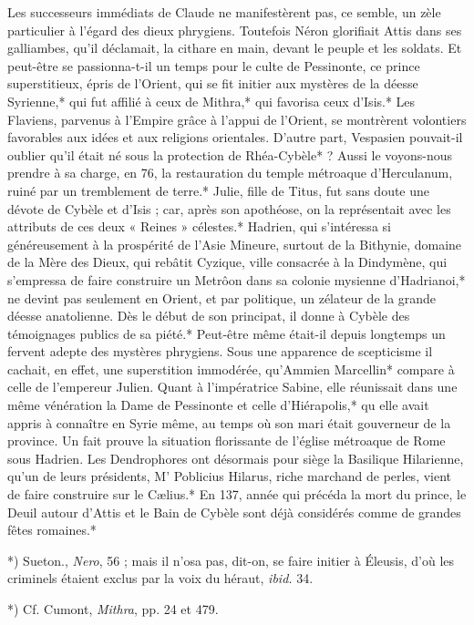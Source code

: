 \documentclass[a4paper, 11pt, oneside, polutonikogreek, french]{article}
\begin{document}
Les successeurs immédiats de Claude ne manifestèrent pas, ce semble, un zèle particulier à l'égard des dieux phrygiens. Toutefois Néron glorifiait Attis dans ses galliambes, qu'il déclamait, la cithare en main, devant le peuple et les soldats. Et peut-être se passionna-t-il un temps pour le culte de Pessinonte, ce prince superstitieux, épris de l'Orient, qui se fit initier aux mystères de la déesse Syrienne,* qui fut affilié à ceux de Mithra,* qui favorisa ceux d'Isis.* Les Flaviens, parvenus à l'Empire grâce à l'appui de l'Orient, se montrèrent volontiers favorables aux idées et aux religions orientales. D'autre part, Vespasien pouvait-il oublier qu'il était né sous la protection de Rhéa-Cybèle* ? Aussi le voyons-nous prendre à sa charge, en 76, la restauration du temple métroaque d'Herculanum, ruiné par un tremblement de terre.* Julie, fille de Titus, fut sans doute une dévote de Cybèle et d'Isis ; car, après son apothéose, on la représentait avec les attributs de ces deux « Reines » célestes.* Hadrien, qui s'intéressa si généreusement à la prospérité de l'Asie Mineure, surtout de la Bithynie, domaine de la Mère des Dieux, qui rebâtit Cyzique, ville consacrée à la Dindymène, qui s'empressa de faire construire un Metrôon dans sa colonie mysienne d'Hadrianoi,* ne devint pas seulement en Orient, et par politique, un zélateur de la grande déesse anatolienne. Dès le début de son principat, il donne à Cybèle des témoignages publics de sa piété.* Peut-être même était-il depuis longtemps un fervent adepte des mystères phrygiens. Sous une apparence de scepticisme il cachait, en effet, une superstition immodérée, qu'Ammien Marcellin* compare à celle de l'empereur Julien. Quant à l'impératrice Sabine, elle réunissait dans une même vénération la Dame de Pessinonte et celle d'Hiérapolis,* qu elle avait appris à connaître en Syrie même, au temps où son mari était gouverneur de la province. Un fait prouve la situation florissante de l'église métroaque de Rome sous Hadrien. Les Dendrophores ont désormais pour siège la Basilique Hilarienne, qu'un de leurs présidents, M' Poblicius Hilarus, riche marchand de perles, vient de faire construire sur le Cælius.* En 137, année qui précéda la mort du prince, le Deuil autour d'Attis et le Bain de Cybèle sont déjà considérés comme de grandes fêtes romaines.*

*) Sueton., \emph{Nero}, 56 ; mais il n'osa pas, dit-on, se faire initier à Éleusis, d'où les criminels étaient exclus par la voix du héraut, \emph{ibid.} 34.

*) Cf. Cumont, \emph{Mithra}, pp. 24 et 479.
\end{document}
